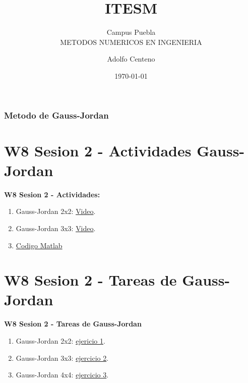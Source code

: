 \documentclass{beamer}
\begin{document}
\title{ITESM}  
\subtitle{Campus Puebla\\METODOS NUMERICOS EN INGENIERIA
}
\author{Adolfo Centeno}
\date{\today} 


\begin{frame}
\titlepage
\end{frame}

\begin{frame}\frametitle{Metodo de Gauss-Jordan}
\tableofcontents
\end{frame} 


\section{W8 Sesion 2 - Actividades Gauss-Jordan }

\begin{frame}

\textbf{W8 Sesion 2 - Actividades:}

\begin{enumerate}
\item
	Gauss-Jordan 2x2: \href{https://www.youtube.com/watch?v=10dlmC1MDco}{Video}.	
\item
	Gauss-Jordan 3x3: \href{https://www.youtube.com/watch?v=pUabaQqbrug}{Video}.	

\item
	\href{https://github.com/adsoftsito/metodos-numericos/blob/master/w8/eliminaciongausiana/eliminaciongausian.m}{Codigo Matlab} 

	

\end{enumerate} 

\end{frame}


\section{W8 Sesion 2 - Tareas de Gauss-Jordan}

\begin{frame}


\textbf{W8 Sesion 2 - Tareas de Gauss-Jordan}


\begin{enumerate}
\item
	Gauss-Jordan 2x2: \href{https://www.youtube.com/watch?v=zn9BTnoGux8}{ejericio 1}.	
\item
	Gauss-Jordan 3x3: \href{https://www.youtube.com/watch?v=em0ZWErimyU}{ejercicio 2}.	
\item
	Gauss-Jordan 4x4: \href{https://www.youtube.com/watch?v=uL3JwFy9BWA}{ejercicio 3}.	

\end{enumerate} 


\end{frame}
\end{document}

